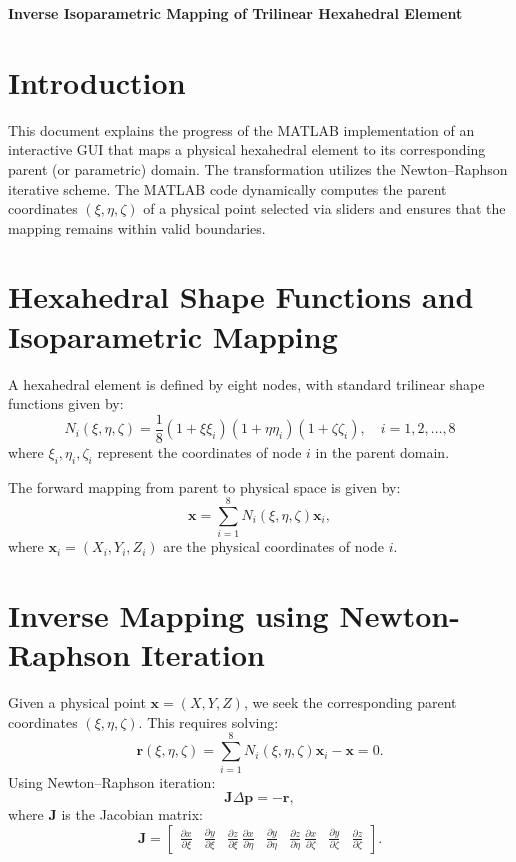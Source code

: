 \documentclass[letterpaper, 11pt]{article}
\begin{document}
	{
		\LARGE
		\textbf{Inverse Isoparametric Mapping of Trilinear Hexahedral Element}
		
	}
	\section{Introduction}
	This document explains the progress of the MATLAB implementation of an interactive GUI that maps a physical hexahedral element to its corresponding parent (or parametric) domain. The transformation utilizes the Newton–Raphson iterative scheme. The MATLAB code dynamically computes the parent coordinates $(\xi, \eta, \zeta)$ of a physical point selected via sliders and ensures that the mapping remains within valid boundaries.
	
	\section{Hexahedral Shape Functions and Isoparametric Mapping}
	A hexahedral element is defined by eight nodes, with standard trilinear shape functions given by:
	\begin{equation}
		N_i(\xi, \eta, \zeta) = \frac{1}{8} (1 + \xi \xi_i)(1 + \eta \eta_i)(1 + \zeta \zeta_i), \quad i = 1,2,\dots,8
	\end{equation}
	where $\xi_i, \eta_i, \zeta_i$ represent the coordinates of node $i$ in the parent domain.
	
	The forward mapping from parent to physical space is given by:
	\begin{equation}
		\mathbf{x} = \sum_{i=1}^{8} N_i(\xi, \eta, \zeta) \mathbf{x}_i,
	\end{equation}
	where $\mathbf{x}_i = (X_i, Y_i, Z_i)$ are the physical coordinates of node $i$.
	
	\section{Inverse Mapping using Newton-Raphson Iteration}
	Given a physical point $\mathbf{x} = (X,Y,Z)$, we seek the corresponding parent coordinates $(\xi, \eta, \zeta)$. This requires solving:
	\begin{equation}
		\mathbf{r}(\xi, \eta, \zeta) = \sum_{i=1}^{8} N_i(\xi, \eta, \zeta) \mathbf{x}_i - \mathbf{x} = 0.
	\end{equation}
	Using Newton–Raphson iteration:
	\begin{equation}
		\mathbf{J} \Delta \mathbf{p} = -\mathbf{r},
	\end{equation}
	where $\mathbf{J}$ is the Jacobian matrix:
	\begin{equation}
		\mathbf{J} = \begin{bmatrix} \frac{\partial x}{\partial \xi} & \frac{\partial y}{\partial \xi} & \frac{\partial z}{\partial \xi} \ \frac{\partial x}{\partial \eta} & \frac{\partial y}{\partial \eta} & \frac{\partial z}{\partial \eta} \ \frac{\partial x}{\partial \zeta} & \frac{\partial y}{\partial \zeta} & \frac{\partial z}{\partial \zeta} \end{bmatrix}.
	\end{equation}
	
\end{document}
